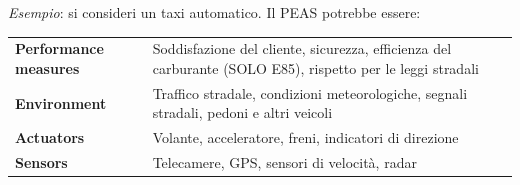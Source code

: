 \documentclass[a4paper, 11pt, oneside]{book}
\theoremstyle{definition}
\begin{document}
	\emph{Esempio}: si consideri un taxi automatico. Il PEAS
	potrebbe essere:
	\begin{table}[H]
		\centering
		\renewcommand{\arraystretch}{1.3}
		\begin{tabularx}{\textwidth}{@{}l X@{}}
			\toprule
			\textbf{Performance measures} & Soddisfazione del cliente, sicurezza, efficienza
				del carburante (SOLO E85), rispetto per le leggi stradali \\
			\textbf{Environment} & Traffico stradale, condizioni meteorologiche,
				segnali stradali, pedoni e altri veicoli \\
			\textbf{Actuators} & Volante, acceleratore, freni, indicatori di direzione \\
			\textbf{Sensors} & Telecamere, GPS, sensori di velocit\`a, radar \\
			\bottomrule
		\end{tabularx}
	\end{table}
\end{document}
